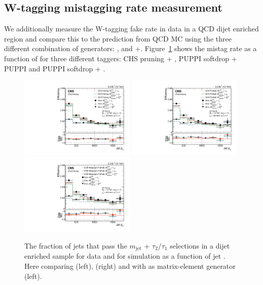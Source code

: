 \subsection{W-tagging mistagging rate measurement} 
\label{sec:searchII:wmistag}
We additionally measure the W-tagging fake rate in data in a QCD dijet enriched region and compare this to the prediction from QCD MC using the three different combination of generators: \HERWIG{++}, \PYTHIA and \MADGRAPH+\PYTHIA.
Figure~\ref{fig:searchII:fakerate} shows the mistag rate as a function of \PT for three different taggers: CHS pruning + \nsubj, PUPPI softdrop + PUPPI \nsubj and PUPPI softdrop + \ddt.
\begin{figure}[h!]
\centering
\includegraphics[width=0.49\textwidth]{figures/vtagging/JME-16-003/BoostedW/BkgEff_DataMC_herwig_pT.pdf}
\includegraphics[width=0.49\textwidth]{figures/vtagging/JME-16-003/BoostedW/BkgEff_DataMC_Pythia8_pT.pdf}\\
\includegraphics[width=0.49\textwidth]{figures/vtagging/JME-16-003/BoostedW/BkgEff_DataMC_Pythia8Madgraph_pT.pdf}
\caption{ 
The fraction of jets that pass the $m_{\mathrm{jet}}$ + $\tau_2/\tau_1$ selections in a dijet enriched sample for data and for simulation as a function of jet \PT. Here comparing \HERWIG{++} (left),  (right) and  with \MADGRAPH as matrix-element generator (left).}
\label{fig:searchII:fakerate}
\end{figure}

